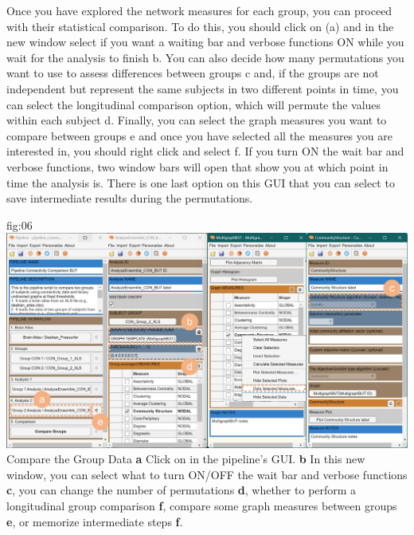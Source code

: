 \documentclass[justified]{tufte-handout}
\begin{document}
Once you have explored the network measures for each group, you can proceed with their statistical comparison. To do this, you should click on  (a) and in the new window select if you want a waiting bar and verbose functions ON while you wait for the analysis to finish {b}. You can also decide how many permutations you want to use to assess differences between groups {c} and, if the groups are not independent but represent the same subjects in two different points in time, you can select the longitudinal comparison option, which will permute the values within each subject {d}. Finally, you can select the graph measures you want to compare between groups {e} and once you have selected all the measures you are interested in, you should right click and select  {f}. If you turn ON the wait bar and verbose functions, two window bars will open that show you at which point in time the analysis is. There is one last option on this GUI that you can select to save intermediate results during the permutations.

	{fig:06}
	{
	\includegraphics{fig06.jpg}
	}
	{Compare the Group Data}
	{
	{\bf a} Click on  in the pipeline's GUI.
	{\bf b} In this new window, you can select what to turn ON/OFF the wait bar and verbose functions {\bf c}, you can change the number of permutations {\bf d}, whether to perform a longitudinal group comparison {\bf f}, compare some graph measures between groups {\bf e}, or memorize intermediate steps {\bf f}.
	}
\end{document}
